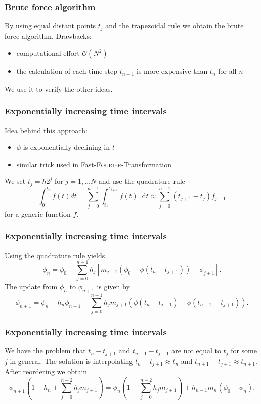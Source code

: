 \documentclass[12pt,a4paper,handout]{beamer}
\theoremstyle{definition}
\theoremstyle{plain}
\newcommand{\D}{\mathop{}\!\mathrm{d}}
\begin{document}
\begin{frame}
    \frametitle{Brute force algorithm}
    By using equal distant points $t_j$ and the trapezoidal rule we obtain the brute force algorithm. Drawbacks:
    \begin{itemize}[<+->]
        \item computational effort $\mathcal{O}(N^2)$
        \item the calculation of each time step $t_{n+1}$ is more expensive than $t_{n}$ for all $n$
    \end{itemize}
    We use it to verify the other ideas.
\end{frame}
\begin{frame}
    \frametitle{Exponentially increasing time intervals}
    Idea behind this approach:
    \begin{itemize}[<+->]
        \item $\phi$ is exponentially declining in $t$
        \item similar trick used in Fast-\textsc{Fourier}-Transformation
    \end{itemize}
We set $t_j=h2^j$ for $j=1,\dotsc N$ and use the quadrature rule
\begin{equation*}
    \int_0^{t_n}f(t)dt=\sum_{j=0}^{n-1}\int_{t_j}^{t_{j+1}}f(t)\D t\approx\sum_{j=0}^{n-1}(t_{j+1}-t_j)f_{j+1}
\end{equation*}
for a generic function $f$.
\end{frame}
\begin{frame}
    \frametitle{Exponentially increasing time intervals}
    Using the quadrature rule yields
    \begin{equation*}
        \phi_n = \phi_0 + \sum_{j=0}^{n-1}h_j[m_{j+1}(\phi_0-\phi(t_n-t_{j+1}))-\phi_{j+1}].
    \end{equation*}
    The update from $\phi_n$ to $\phi_{n+1}$ is given by
    \begin{equation*}
        \phi_{n+1}= \phi_n -h_n\phi_{n+1}+\sum_{j=0}^{n-1}h_jm_{j+1}(\phi(t_n-t_{j+1})-\phi(t_{n+1}-t_{j+1})).
    \end{equation*}
\end{frame}
\begin{frame}
    \frametitle{Exponentially increasing time intervals}
    We have the problem that $t_n-t_{j+1}$ and $t_{n+1}-t_{j+1}$ are not equal to $t_j$ for some $j$ in general. The solution is interpolating $t_n-t_{j+1}\approx t_n$ and $t_{n+1}-t_{j+1}\approx t_{n+1}$. After reordering we obtain
    \begin{equation*}
         \phi_{n+1}(1 + h_n + \sum_{j=0}^{n-2}h_jm_{j+1})=\phi_n(1+\sum_{j=0}^{n-2}h_jm_{j+1})+h_{n-1}m_n(\phi_0-\phi_n).
    \end{equation*}
\end{frame}
\end{document}
